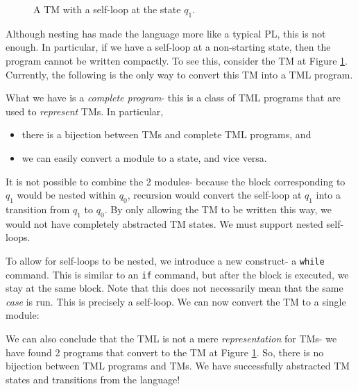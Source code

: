 \begin{figure}[htb]
    \centering
    \caption{A TM with a self-loop at the state $q_1$.}
    \label{fig:self-loop-TM}
\end{figure}
Although nesting has made the language more like a typical PL, this is not enough. In particular, if we have a self-loop at a non-starting state, then the program cannot be written compactly. To see this, consider the TM at Figure \ref{fig:self-loop-TM}. Currently, the following is the only way to convert this TM into a TML program.

What we have is a \emph{complete program}- this is a class of TML programs that are used to \textit{represent} TMs. In particular, 
\begin{itemize}
    \item there is a bijection between TMs and complete TML programs, and
    \item we can easily convert a module to a state, and vice versa.
\end{itemize}
It is not possible to combine the 2 modules- because the block corresponding to $q_1$ would be nested within $q_0$, recursion would convert the self-loop at $q_1$ into a transition from $q_1$ to $q_0$. By only allowing the TM to be written this way, we would not have completely abstracted TM states. We must support nested self-loops.

To allow for self-loops to be nested, we introduce a new construct- a \texttt{while} command. This is similar to an \texttt{if} command, but after the block is executed, we stay at the same block. Note that this does not necessarily mean that the same \textit{case} is run. This is precisely a self-loop. We can now convert the TM to a single module:

We can also conclude that the TML is not a mere \textit{representation} for TMs- we have found 2 programs that convert to the TM at Figure \ref{fig:self-loop-TM}. So, there is no bijection between TML programs and TMs. We have successfully abstracted TM states and transitions from the language!

